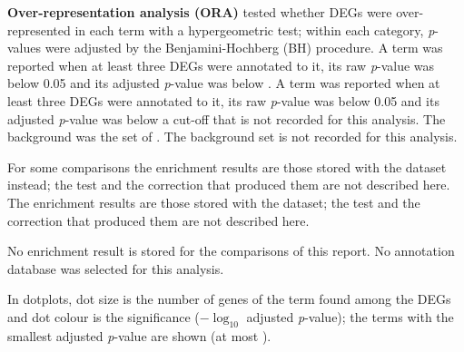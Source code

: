 \textbf{Over-representation analysis (ORA)} tested whether DEGs were over-represented in each term with a hypergeometric test; within each category, \textit{p}-values were adjusted by the Benjamini-Hochberg (BH) procedure.
A term was reported when at least three DEGs were annotated to it, its raw \textit{p}-value was below 0.05 and its adjusted \textit{p}-value was below .
A term was reported when at least three DEGs were annotated to it, its raw \textit{p}-value was below 0.05 and its adjusted \textit{p}-value was below a cut-off that is not recorded for this analysis.
The background was the set of .
The background set is not recorded for this analysis.

For some comparisons the enrichment results are those stored with the dataset instead; the test and the correction that produced them are not described here.
The enrichment results are those stored with the dataset; the test and the correction that produced them are not described here.

No enrichment result is stored for the comparisons of this report.
No annotation database was selected for this analysis.

In dotplots, dot size is the number of genes of the term found among the DEGs and dot colour is the significance ($-\log_{10}$ adjusted \textit{p}-value); the terms with the smallest adjusted \textit{p}-value are shown (at most ).
